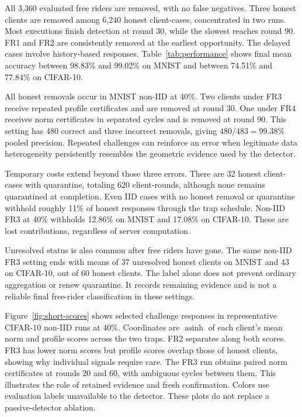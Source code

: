 \documentclass[conference]{IEEEtran}
\makeatletter
\renewcommand{\subsection}{\@startsection{subsection}{2}{\z@}{1.5ex}{0.7ex}{\normalfont\normalsize\itshape}}
\makeatother
\begin{document}
\subsection{Detection and Honest-Client Impact}
All 3,360 evaluated free riders are removed, with no false negatives.
Three honest clients are removed among 6,240 honest client-cases,
concentrated in two runs. Most executions finish detection at round 30,
while the slowest reaches round 90. FR1 and FR2 are consistently removed
at the earliest opportunity. The delayed cases involve history-based
responses. Table~\ref{tab:performance} shows final mean accuracy between
98.83\% and 99.02\% on MNIST and between 74.51\% and 77.84\% on CIFAR-10.

All honest removals occur in MNIST non-IID at 40\%. Two clients under
FR3 receive repeated profile certificates and are removed at round 30.
One under FR4 receives norm certificates in separated cycles and is
removed at round 90. This setting has 480 correct and three incorrect
removals, giving $480/483=99.38\%$ pooled precision. Repeated challenges
can reinforce an error when legitimate data heterogeneity persistently
resembles the geometric evidence used by the detector.

Temporary costs extend beyond those three errors. There are 32 honest
client-cases with quarantine, totaling 620 client-rounds, although none
remains quarantined at completion. Even IID cases with no honest removal
or quarantine withhold roughly 11\% of honest responses through the trap
schedule. Non-IID FR3 at 40\% withholds 12.86\% on MNIST and 17.08\% on
CIFAR-10. These are lost contributions, regardless of server computation.

Unresolved status is also common after free riders have gone. The same
non-IID FR3 setting ends with means of 37 unresolved honest clients on
MNIST and 43 on CIFAR-10, out of 60 honest clients. The label alone
does not prevent ordinary aggregation or renew quarantine. It records
remaining evidence and is not a reliable final free-rider classification
in these settings.

Figure~\ref{fig:short-scores} shows selected challenge responses in
representative CIFAR-10 non-IID runs at 40\%. Coordinates are
$\operatorname{asinh}$ of each client's mean norm and profile scores
across the two traps. FR2 separates along both scores. FR3 has lower
norm scores but profile scores overlap those of honest clients, showing
why individual signals require care. The FR3 run obtains paired norm
certificates at rounds 20 and 60, with ambiguous cycles between them.
This illustrates the role of retained evidence and fresh confirmation.
Colors use evaluation labels unavailable to the detector. These plots
do not replace a passive-detector ablation.

\end{document}
